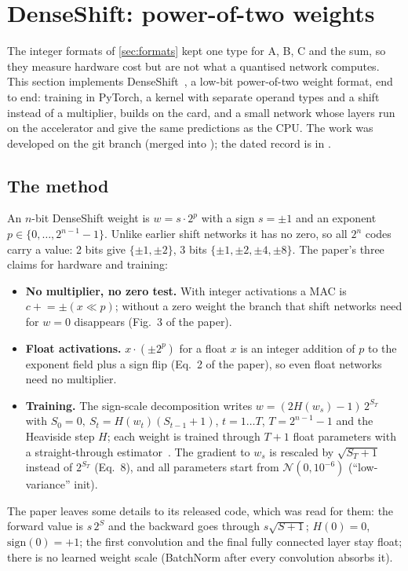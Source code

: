 \section{DenseShift: power-of-two weights}
\label{sec:ds}

The integer formats of \cref{sec:formats} kept one type for A, B, C and the sum, so they measure hardware cost but are
not what a quantised network computes. This section implements DenseShift~\cite{denseshift}, a low-bit
power-of-two weight format, end to end: training in PyTorch, a kernel with separate operand types and a shift
instead of a multiplier, builds on the card, and a small network whose layers run on the accelerator and give the
same predictions as the CPU. The work was developed on the git branch  (merged into ); the dated record is in
.

\subsection{The method}
\label{sec:ds:method}
An \(n\)-bit DenseShift weight is \(w = s\cdot 2^{p}\) with a sign \(s = \pm 1\) and an exponent
\(p \in \{0,\dots,2^{n-1}-1\}\). Unlike earlier shift networks it has no zero, so all \(2^n\) codes carry a value:
2 bits give \(\{\pm1,\pm2\}\), 3 bits \(\{\pm1,\pm2,\pm4,\pm8\}\). The paper's three claims for hardware and training:
\begin{itemize}
  \item \textbf{No multiplier, no zero test.} With integer activations a MAC is \(c \mathrel{+}= \pm(x \ll p)\); without
        a zero weight the branch that shift networks need for \(w = 0\) disappears (Fig.~3 of the paper).
  \item \textbf{Float activations.} \(x\cdot(\pm 2^p)\) for a float \(x\) is an integer addition of \(p\) to the exponent
        field plus a sign flip (Eq.~2 of the paper), so even float networks need no multiplier.
  \item \textbf{Training.} The sign-scale decomposition writes \(w = (2H(w_s) - 1)\,2^{S_T}\) with
        \(S_0 = 0,\ S_t = H(w_t)(S_{t-1}+1)\), \(t = 1\dots T\), \(T = 2^{n-1}-1\) and the Heaviside step \(H\); each
        weight is trained through \(T+1\) float parameters with a straight-through estimator~\cite{s3shift}. The
        gradient to \(w_s\) is rescaled by \(\sqrt{S_T+1}\) instead of \(2^{S_T}\) (Eq.~8), and all parameters start
        from \(\mathcal N(0, 10^{-6})\) (``low-variance'' init).
\end{itemize}
The paper leaves some details to its released code, which was read for them: the forward value is \(s\,2^{S}\) and the
backward goes through \(s\sqrt{S+1}\); \(H(0) = 0\), \(\mathrm{sign}(0) = +1\); the first convolution and the final
fully connected layer stay float; there is no learned weight scale (BatchNorm after every convolution absorbs it).

